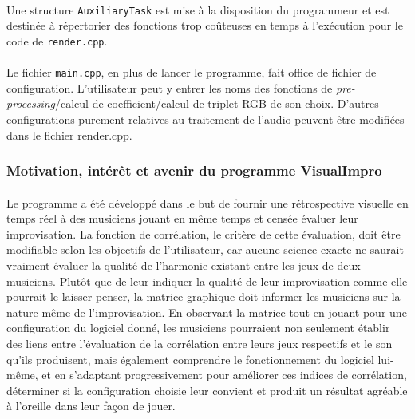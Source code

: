 \paragraph{}
Une structure \verb!AuxiliaryTask! est mise à la disposition du
programmeur et est destinée à répertorier des fonctions trop coûteuses
en temps à l'exécution pour le code de \verb!render.cpp!.

\paragraph{}
Le fichier \verb!main.cpp!, en plus de lancer le programme, fait office de
fichier de configuration. L'utilisateur peut y entrer les noms des
fonctions de \textit{pre-processing}/calcul de coefficient/calcul de
triplet RGB de son choix. D'autres configurations purement relatives
au traitement de l'audio peuvent être modifiées dans le fichier
render.cpp.

\subsubsection{Motivation, intérêt et avenir du programme VisualImpro}
\paragraph{}
Le programme a été développé dans le but de fournir une rétrospective
visuelle en temps réel à des musiciens jouant en même temps et censée
évaluer leur improvisation. La fonction de corrélation, le critère de
cette évaluation, doit être modifiable selon les objectifs de
l'utilisateur, car aucune science exacte ne saurait vraiment évaluer
la qualité de l'harmonie existant entre les jeux de deux
musiciens. Plutôt que de leur indiquer la qualité de leur
improvisation comme elle pourrait le laisser penser, la matrice
graphique doit informer les musiciens sur la nature même de
l'improvisation. En observant la matrice tout en jouant pour une
configuration du logiciel donné, les musiciens pourraient non
seulement établir des liens entre l'évaluation de la corrélation entre
leurs jeux respectifs et le son qu'ils produisent, mais également
comprendre le fonctionnement du logiciel lui-même, et en s'adaptant
progressivement pour améliorer ces indices de corrélation, déterminer
si la configuration choisie leur convient et produit un résultat
agréable à l'oreille dans leur façon de jouer.

